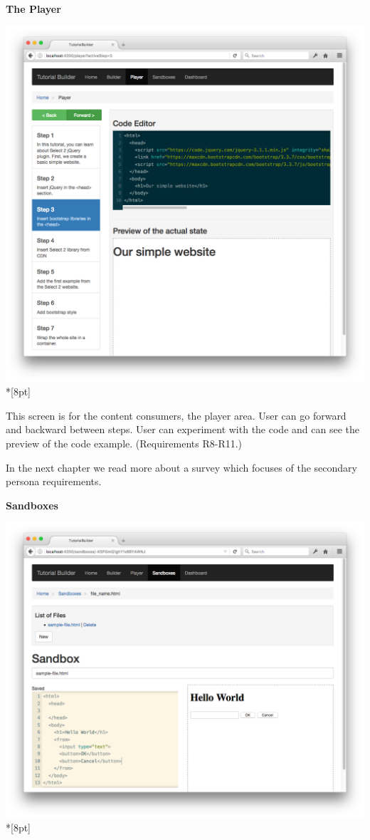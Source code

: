 \documentclass[11pt, a4paper, oneside, openright, medskipamount]{report}
\begin{document}
\newpage

\textbf{The Player}

\includegraphics[width=1\textwidth]{assets/tour-screenshots/the-player.png}\\*[8pt]

This screen is for the content consumers, the player area. User can go forward and backward between steps. User can experiment with the code and can see the preview of the code example. (Requirements R8-R11.)

In the next chapter we read more about a survey which focuses of the secondary persona requirements.

\newpage

\textbf{Sandboxes}

\includegraphics[width=1\textwidth]{assets/tour-screenshots/the-sandbox.png}\\*[8pt]
\end{document}
